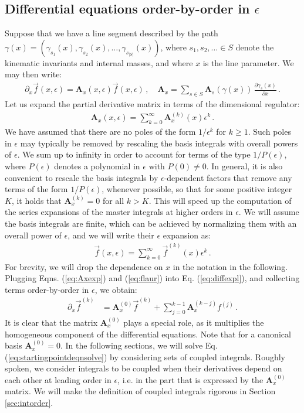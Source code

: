 \documentclass{article}
\begin{document}
\subsection{Differential equations order-by-order in $\epsilon$}
\label{sec:deqnsordbyordeps}
Suppose that we have a line segment described by the path $\gamma(x)=(\gamma_{s_1}(x), \gamma_{s_2}(x), \ldots,\gamma_{s_{|S|}}(x))$, where $s_1,s_2,\ldots \in S$ denote the kinematic invariants and internal masses, and where $x$ is the line parameter. We may then write:
\begin{align}
    \label{eq:diffexpl}
    \partial_x \vec{f}(x,\epsilon) = \mathbf{A}_x(x,\epsilon) \vec{f}(x,\epsilon)\,,\quad \mathbf{A}_x = \sum_{s\in S}\mathbf{A}_s(\gamma(x)) \,\frac{\partial \gamma_s(x)}{\partial x}\,.
\end{align}
Let us expand the partial derivative matrix in terms of the dimensional regulator:
\begin{align}
    \label{eq:Axexp}
    \mathbf{A}_x(x,\epsilon) = \sum_{k = 0}^\infty \mathbf{A}_x^{(k)}(x) \epsilon^k\,.
\end{align}
We have assumed that there are no poles of the form $1/\epsilon^k$ for $k\geq 1$. Such poles in $\epsilon$ may typically be removed by rescaling the basis integrals with overall powers of $\epsilon$. We sum up to infinity in order to account for terms of the type $1/P(\epsilon)$, where $P(\epsilon)$ denotes a polynomial in $\epsilon$ with $P(0)\neq 0$. In general, it is also convenient to rescale the basis integrals by $\epsilon$-dependent factors that remove any terms of the form $1/P(\epsilon)$, whenever possible, so that for some positive integer $K$, it holds that $\mathbf{A}_x^{(k)} = 0$ for all $k>K$. This will speed up the computation of the series expansions of the master integrals at higher orders in $\epsilon$. We will assume the basis integrals are finite, which can be achieved by normalizing them with an overall power of $\epsilon$, and we will write their $\epsilon$ expansion as:
\begin{align}
    \label{eq:flaur}
    \vec{f}(x,\epsilon) = \sum_{k = 0}^\infty \vec{f}^{(k)}(x) \epsilon^k\,.
\end{align}
For brevity, we will drop the dependence on $x$ in the notation in the following. Plugging Eqns. (\ref{eq:Axexp}) and (\ref{eq:flaur}) into Eq. (\ref{eq:diffexpl}), and collecting terms order-by-order in $\epsilon$, we obtain:
\begin{align}
    \label{eq:startingpointdeqnsolve}
    \partial_x \vec{f}^{(k)} &= \mathbf{A}_x^{(0)}\vec{f}^{(k)} + \sum_{j=0}^{k-1} \mathbf{A}_x^{(k-j)} f^{(j)}\,.
\end{align}
It is clear that the matrix $\mathbf{A}_x^{(0)}$ plays a special role, as it multiplies the homogeneous component of the differential equations. Note that for a canonical basis $\mathbf{A}_x^{(0)} = 0$. In the following sections, we will solve Eq. (\ref{eq:startingpointdeqnsolve}) by considering sets of coupled integrals. Roughly spoken, we consider integrals to be coupled when their derivatives depend on each other at leading order in $\epsilon$, i.e. in the part that is expressed by the $\mathbf{A}_x^{(0)}$ matrix. We will make the definition of coupled integrals rigorous in Section \ref{sec:intorder}. 
\end{document}
